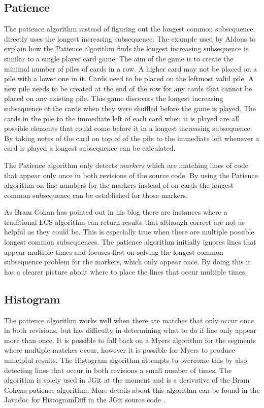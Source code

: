 \subsection{Patience}
The patience algorithm instead of figuring out the longest common subsequence directly uses the longest increasing subsequence. 
The example used by Aldous \cite{Aldous1999} to explain how the Patience algorithm finds the longest increasing subsequence is similar to a single player card game.
The aim of the game is to create the minimal number of piles of cards in a row.
A higher card may not be placed on a pile with a lower one in it.
Cards need to be placed on the leftmost valid pile. 
A new pile needs to be created at the end of the row for any cards that cannot be placed on any existing pile.
This game discovers the longest increasing subsequence of the cards when they were shuffled before the game is played.
The cards in the pile to the immediate left of each card when it is played are all possible elements that could come before it in a longest increasing subsequence.
By taking notes of the card on top of of the pile to the immediate left whenever a card is played a longest subsequence can be calculated.     

The Patience algorithm only detects \emph{markers} which are matching lines of code that appear only once in both revisions of the source code.
By using the Patience algorithm on line numbers for the markers instead of on cards the longest common subsequence can be established for those markers. 

As Bram Cohan \cite{bramcohen} has pointed out in his blog there are instances where a traditional LCS algorithm can return results that although correct are not as helpful as they could be.
This is especially true when there are multiple possible longest common subsequences.
The patience algorithm initially ignores lines that appear multiple times and focuses first on solving the longest common subsequence problem for the markers, which only appear once. 
By doing this it has a clearer picture about where to place the lines that occur multiple times.

\subsection{Histogram}
The patience algorithm works well when there are matches that only occur once in both revisions, but has difficulty in determining what to do if line only appear more than once.
It is possible to fall back on a Myers algorithm for the segments where multiple matches occur, however it is possible for Myers to produce unhelpful results. 
The Histogram algorithm attempts to overcome this by also detecting lines that occur in both revisions a small number of times.
The algorithm is solely used in JGit at the moment and is a derivative of the Bram Cohens patience algorithm. 
More details about this algorithm can be found in the Javadoc for HistogramDiff in the JGit source code \cite{Foundation2014}. 


